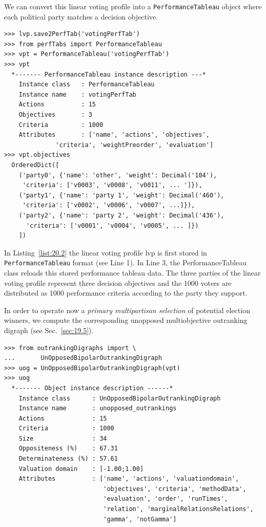 We can convert this linear voting profile into a \texttt{PerformanceTableau} object where each political party matches a decision objective.
\begin{lstlisting}[caption={Converting a voting profile into a performance tableau},label=list:20.2]
>>> lvp.save2PerfTab('votingPerfTab')
>>> from perfTabs import PerformanceTableau
>>> vpt = PerformanceTableau('votingPerfTab')
>>> vpt
  *------- PerformanceTableau instance description ---*
    Instance class   : PerformanceTableau
    Instance name    : votingPerfTab
    Actions          : 15
    Objectives       : 3
    Criteria         : 1000
    Attributes       : ['name', 'actions', 'objectives',
              'criteria', 'weightPreorder', 'evaluation']
>>> vpt.objectives
  OrderedDict([
    ('party0', {'name': 'other', 'weight': Decimal('104'),
     'criteria': ['v0003', 'v0008', 'v0011', ... ']}),
    ('party1', {'name': 'party 1', 'weight': Decimal('460'),
     'criteria': ['v0002', 'v0006', 'v0007', ...]}),
    ('party2', {'name': 'party 2', 'weight': Decimal('436'),
      'criteria': ['v0001', 'v0004', 'v0005', ... ]})
    ])
\end{lstlisting}

In Listing~\vref{list:20.2} the linear voting profile lvp is first stored in \texttt{PerformanceTableau} format (see Line 1). In Line 3, the PerformanceTableau class reloads this stored performance tableau data. The three parties of the linear voting profile represent three decision objectives and the 1000 voters are distributed as 1000 performance criteria according to the party they support.


In order to operate now a \emph{primary multipartisan selection} of potential election winners, we compute the corresponding unopposed multiobjective outranking digraph (see Sec.~\ref{sec:19.5}).
\begin{lstlisting}[caption={Computing unopposed multiobjective outranking situations},label=list:20.3]
>>> from outrankingDigraphs import \
...       UnOpposedBipolarOutrankingDigraph
>>> uog = UnOpposedBipolarOutrankingDigraph(vpt)
>>> uog
  *------- Object instance description ------*
    Instance class      : UnOpposedBipolarOutrankingDigraph
    Instance name       : unopposed_outrankings
    Actions             : 15
    Criteria            : 1000
    Size                : 34
    Oppositeness (%)    : 67.31
    Determinateness (%) : 57.61
    Valuation domain    : [-1.00;1.00]
    Attributes          : ['name', 'actions', 'valuationdomain',
                           'objectives', 'criteria', 'methodData',
                           'evaluation', 'order', 'runTimes',
                           'relation', 'marginalRelationsRelations',
                           'gamma', 'notGamma']
\end{lstlisting}

